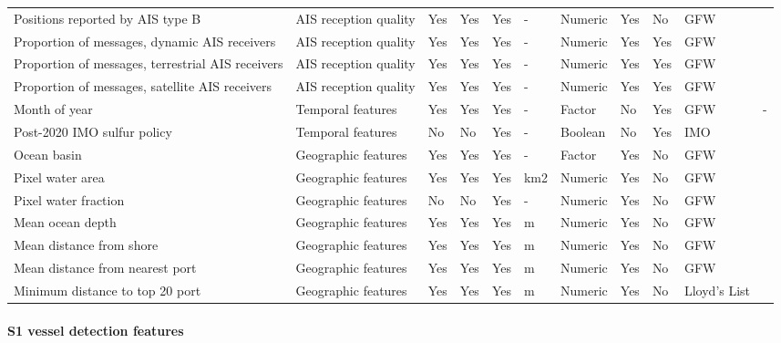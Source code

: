 \documentclass[lineno,pdflatex,sn-nature]{sn-jnl}
\providecommand{\DIFaddbegin}{} %
\providecommand{\DIFaddend}{} %
\providecommand{\DIFaddendFL}{} %
\providecommand{\DIFaddincludegraphics}[2][]{{\color{blue}\fbox{\DIFOincludegraphics[#1]{#2}}}} %
\DeclareRobustCommand{\DIFaddbegin}{\DIFOaddbegin \let\includegraphics\DIFaddincludegraphics} %
\DeclareRobustCommand{\DIFaddend}{\DIFOaddend \let\includegraphics\DIFOincludegraphics} %
\DeclareRobustCommand{\DIFaddendFL}{\DIFOaddendFL \let\includegraphics\DIFOincludegraphics} %
\begin{document}
\begin{table}[!h]
\begin{tabular}[t]{lllllllllll}
Positions reported by AIS type B & AIS reception quality & Yes & Yes & Yes & - & Numeric & Yes & No & GFW & \cite{kroodsma2018tracking}\\
Proportion of messages, dynamic AIS receivers & AIS reception quality & Yes & Yes & Yes & - & Numeric & Yes & Yes & GFW & \cite{kroodsma2018tracking}\\
Proportion of messages, terrestrial AIS receivers & AIS reception quality & Yes & Yes & Yes & - & Numeric & Yes & Yes & GFW & \cite{kroodsma2018tracking}\\
Proportion of messages, satellite AIS receivers & AIS reception quality & Yes & Yes & Yes & - & Numeric & Yes & Yes & GFW & \cite{kroodsma2018tracking}\\
\addlinespace
Month of year & Temporal features & Yes & Yes & Yes & - & Factor & No & Yes & GFW & -\\
Post-2020 IMO sulfur policy & Temporal features & No & No & Yes & - & Boolean & No & Yes & IMO & \cite{imo_sulphur_2020}\\
Ocean basin & Geographic features  & Yes & Yes & Yes & - & Factor & Yes & No & GFW & \cite{kroodsma2018tracking}\\
Pixel water area & Geographic features  & Yes & Yes & Yes & km2 & Numeric & Yes & No & GFW & \cite{paolo2024satellite}\\
Pixel water fraction & Geographic features & No & No & Yes & - & Numeric & Yes & No & GFW & \cite{paolo2024satellite}\\
\addlinespace
Mean ocean depth & Geographic features  & Yes & Yes & Yes & m & Numeric & Yes & No & GFW & \cite{kroodsma2018tracking}\\
Mean distance from shore & Geographic features  & Yes & Yes & Yes & m & Numeric & Yes & No & GFW & \cite{kroodsma2018tracking}\\
Mean distance from nearest port & Geographic features  & Yes & Yes & Yes & m & Numeric & Yes & No & GFW & \cite{kroodsma2018tracking}\\
Minimum distance to top 20 port & Geographic features  & Yes & Yes & Yes & m & Numeric & Yes & No & Lloyd’s List & \cite{LloydsListTopPorts2024}\\
\bottomrule
\end{tabular}
\DIFaddendFL \end{table}
\DIFaddbegin \FloatBarrier
\DIFaddend 

\clearpage

\paragraph{S1 vessel detection features}
\end{document}
